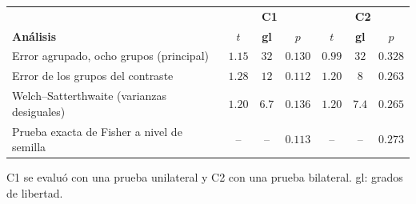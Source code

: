 \begin{tabular}{lcccccc}
\hline\hline
& \multicolumn{3}{c}{\textbf{C1}} & \multicolumn{3}{c}{\textbf{C2}} \\
\textbf{An\'alisis} & \textbf{$t$} & \textbf{gl} & \textbf{$p$} & \textbf{$t$} & \textbf{gl} & \textbf{$p$} \\
\hline
Error agrupado, ocho grupos (principal) & $1.15$ & $32$ & $0.130$ & $0.99$ & $32$ & $0.328$ \\
Error de los grupos del contraste & $1.28$ & $12$ & $0.112$ & $1.20$ & $8$ & $0.263$ \\
Welch--Satterthwaite (varianzas desiguales) & $1.20$ & $6.7$ & $0.136$ & $1.20$ & $7.4$ & $0.265$ \\
Prueba exacta de Fisher a nivel de semilla & -- & -- & $0.113$ & -- & -- & $0.273$ \\
\hline
\end{tabular}
\par\vspace{4pt}
\parbox{0.94\linewidth}{\footnotesize C1 se evalu\'o con una prueba unilateral y C2 con una prueba bilateral. gl: grados de libertad.}
